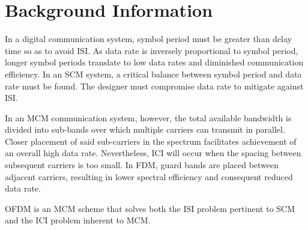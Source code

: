 
\section{Background Information}
In a digital communication system, symbol period must be greater than delay time so as to avoid \gls{ISI}. As data rate is inversely proportional to symbol period, longer symbol periods translate to low data rates and diminished communication efficiency. In an \gls{SCM} system, a critical balance between symbol period and data rate must be found. The designer must compromise data rate to mitigate against \gls{ISI}.

In an \gls{MCM} communication system, however, the total available bandwidth is divided into sub-bands over which multiple carriers can transmit in parallel. Closer placement of said sub-carriers in the spectrum facilitates achievement of an overall high data rate. Nevertheless, \gls{ICI} will occur when the spacing between subsequent carriers is too small. In \gls{FDM}, guard bands are placed between adjacent carriers, resulting in lower spectral efficiency and consequent reduced data rate.

\gls{OFDM} is an \gls{MCM} scheme that solves both the \gls{ISI} problem pertinent to \gls{SCM} and the \gls{ICI} problem inherent to \gls{MCM}. 